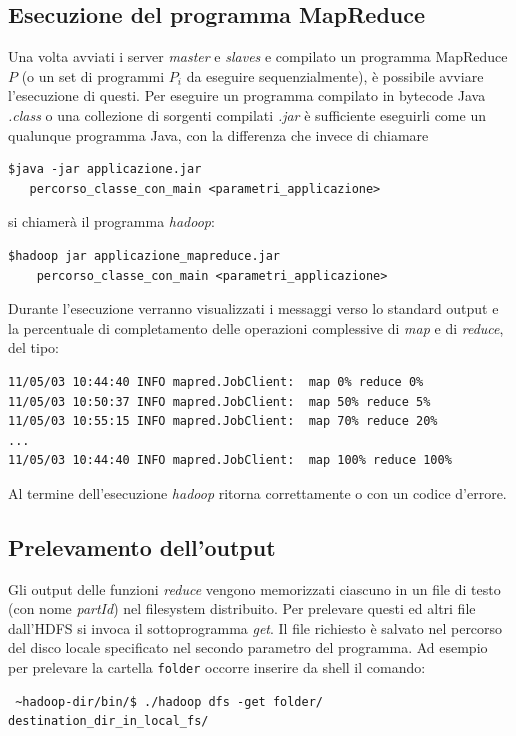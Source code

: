 \documentclass[a4paper,11pt]{report}
\begin{document}
\subsection{Esecuzione del programma MapReduce}
Una volta avviati i server \emph{master} e \emph{slaves} e compilato un programma MapReduce $P$ (o un set di programmi $P_i$ da eseguire
sequenzialmente), è possibile avviare 
l'esecuzione di questi.
Per eseguire un programma compilato in bytecode Java \emph{.class} o una collezione di sorgenti compilati \emph{.jar} è sufficiente
eseguirli come un qualunque programma Java, con
la differenza che invece di chiamare 
\begin{verbatim}
$java -jar applicazione.jar  
   percorso_classe_con_main <parametri_applicazione>
\end{verbatim}
si chiamerà il programma \emph{hadoop}:
\begin{verbatim}
$hadoop jar applicazione_mapreduce.jar 
    percorso_classe_con_main <parametri_applicazione>
\end{verbatim}
Durante l'esecuzione verranno visualizzati i messaggi verso lo standard output e la percentuale di completamento delle operazioni
complessive di \emph{map} e di \emph{reduce},
del tipo:
\begin{verbatim}
11/05/03 10:44:40 INFO mapred.JobClient:  map 0% reduce 0% 
11/05/03 10:50:37 INFO mapred.JobClient:  map 50% reduce 5%
11/05/03 10:55:15 INFO mapred.JobClient:  map 70% reduce 20%   
...
11/05/03 10:44:40 INFO mapred.JobClient:  map 100% reduce 100% 
\end{verbatim}
Al termine dell'esecuzione \emph{hadoop} ritorna correttamente o con un codice d'errore.

\subsection{Prelevamento dell'output}\label{Prelevamento dell'output}
Gli output delle funzioni \emph{reduce} vengono memorizzati ciascuno in un file di testo (con nome \emph{part\textunderscore\emph{Id}}) nel
filesystem distribuito.
Per prelevare questi ed altri file dall'HDFS si invoca il sottoprogramma \emph{get}. Il file richiesto è salvato nel percorso del disco
locale specificato nel secondo parametro
del programma. Ad esempio per prelevare la cartella \verb|folder| occorre inserire da shell il comando:
\begin{verbatim}
 ~hadoop-dir/bin/$ ./hadoop dfs -get folder/ destination_dir_in_local_fs/
\end{verbatim}
\end{document}
